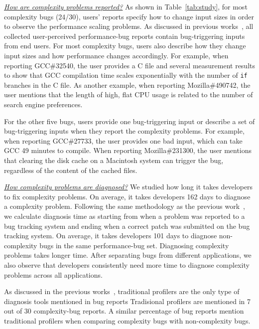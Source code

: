 {\underline{\textit{How are complexity problems reported?}}
As shown in Table~\ref{tab:study},
for most complexity bugs (24/30), 
users' reports specify how to change input sizes 
in order to observe the performance scaling problems. 
As discussed in previous works~\cite{SongOOPSLA2014}, 
all collected user-perceived performance-bug reports
contain bug-triggering inputs from end users. 
For most complexity bugs, 
users also describe how they change input sizes 
and how performance changes accordingly. 
For example, when reporting GCC\#32540, 
the user provides a C file and several measurement results to 
show that GCC compilation time scales exponentially 
with the number of \texttt{if} branches in the C file. 
As another example, when reporting Mozilla\#490742, 
the user mentions that the length of high, 
flat CPU usage is related to the number of search engine preferences. 


For the other five bugs, users provide one bug-triggering input 
or describe a set of bug-triggering inputs when they report the complexity problems. 
For example, when reporting GCC\#27733, 
the user provides one bad input, which can take GCC 49 minutes to compile. 
When reporting Mozilla\#231300, the user mentions 
that clearing the disk cache on a Macintosh system can trigger the bug, 
regardless of the content of the cached files. 


{\underline{\textit{How complexity problems are diagnosed?}}
We studied how long it takes developers to fix complexity problems. 
On average, it takes developers 162 days to diagnose a complexity problem. 
Following the same methodology as the previous work~\cite{SongOOPSLA2014},
we calculate diagnosis time as starting from when a problem 
was reported to a bug tracking system
and ending when a correct patch was submitted on the bug tracking system. 
On average, it takes developers 101 days to diagnose non-complexity bugs in the same performance-bug set. 
Diagnosing complexity problems takes longer time.
After separating bugs from different applications, 
we also observe that developers consistently need more time to diagnose complexity problems across all applications.

As discussed in the previous works~\cite{SongOOPSLA2014}, 
traditional profilers are the only type of diagnosis tools mentioned in bug reports 
Tradisional profilers are mentioned in 7 out of 30 complexity-bug reports. 
A similar percentage of bug reports mention traditional profilers
when comparing complexity bugs with non-complexity bugs. 

}}
